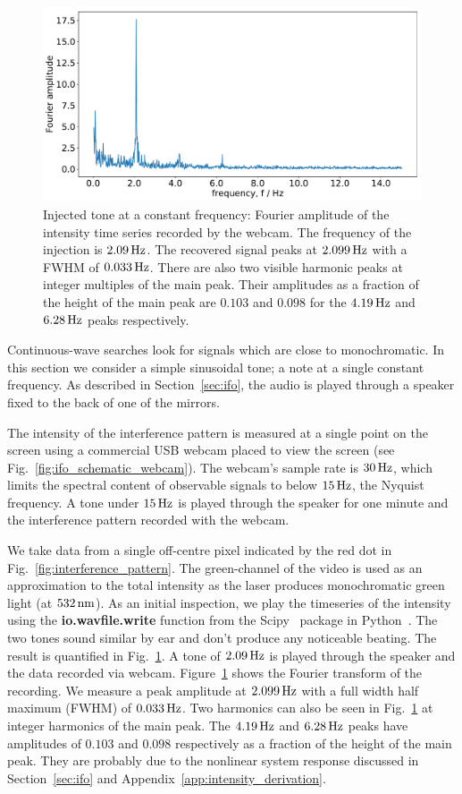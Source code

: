 \documentclass[paper-main.tex]{subfiles}
\begin{document}
\begin{figure}
	\includegraphics[width=.49\textwidth]{figures/webcam_expt_4_0209-cropped.pdf}
	\caption{\label{fig:webcam_spectrum}
Injected tone at a constant frequency: Fourier amplitude of the intensity time series recorded by the webcam. 
The frequency of the injection is $2.09\,{\rm Hz}$. 
The recovered signal peaks at $2.099\,{\rm Hz}$ with a FWHM of $0.033\,{\rm Hz}$. 
There are also two visible harmonic peaks at integer multiples of the main peak. 
Their amplitudes as a fraction of the height of the main peak are  $0.103$ and $0.098$ for the $4.19\,{\rm Hz}$ and $6.28\,{\rm Hz}$ peaks respectively. 
}
	
\end{figure}


Continuous-wave searches look for signals which are close to monochromatic. 
In this section we consider a simple sinusoidal tone; a note at a single constant frequency. 
As described in Section~\ref{sec:ifo}, the audio is played through a speaker fixed to the back of one of the mirrors.


The intensity of the interference pattern is measured at a single point on the screen using a commercial USB webcam placed to view the screen (see Fig.~\ref{fig:ifo_schematic_webcam}). 
The webcam's sample rate is $30\,{\rm Hz}$, which limits the spectral content of observable signals to below $15\,{\rm Hz}$, the Nyquist frequency.
A tone under $15\,{\rm Hz}$ is played through the speaker for one minute and the interference pattern recorded with the webcam. 


We take data from a single off-centre pixel indicated by the red dot in Fig.~\ref{fig:interference_pattern}. 
The green-channel of the video is used as an approximation to the total intensity as the laser produces monochromatic green light (at $532\,{\rm nm}$).
As an initial inspection, we play the timeseries of the intensity using the \textbf{io.wavfile.write} function from the Scipy~\cite{scipy} package in Python~\cite{python}. 
The two tones sound similar by ear and don't produce any noticeable beating. 
The result is quantified in Fig.~\ref{fig:webcam_spectrum}. 
A tone of $2.09\,{\rm Hz}$ is played through the speaker and the data recorded via webcam. 
Figure~\ref{fig:webcam_spectrum} shows the Fourier transform of the recording.
We measure a peak amplitude at $2.099\,{\rm Hz}$ with a full width half maximum (FWHM) of $0.033\,{\rm Hz}$. 
Two harmonics can also be seen in Fig.~\ref{fig:webcam_spectrum} at integer harmonics of the main peak. 
The $4.19\,{\rm Hz}$ and $6.28\,{\rm Hz}$ peaks have amplitudes of $0.103$ and $0.098$ respectively as a fraction of the height of the main peak. 
They are probably due to the nonlinear system response discussed in Section~\ref{sec:ifo} and Appendix~\ref{app:intensity_derivation}. 
\end{document}
